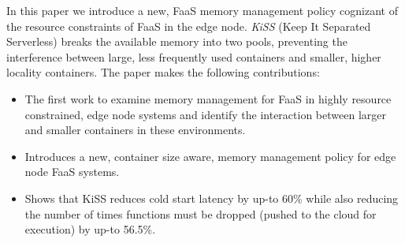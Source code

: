 In this paper we introduce a new, FaaS memory management policy cognizant of the resource constraints of FaaS in the edge node.  \textit{KiSS} (Keep It Separated Serverless) breaks the available memory into two pools, preventing the interference between large, less frequently used containers and smaller, higher locality containers.  The paper makes the following contributions:
\begin{itemize}
    \item The first work to examine memory management for FaaS in highly resource constrained, edge node systems and identify the interaction between larger and smaller containers in these environments.
    \item Introduces a new, container size aware, memory management policy for edge node FaaS systems.
    \item Shows that KiSS reduces cold start latency by up-to 60\% while also reducing the number of times functions must be dropped (pushed to the cloud for execution) by up-to 56.5\%.
\end{itemize}

